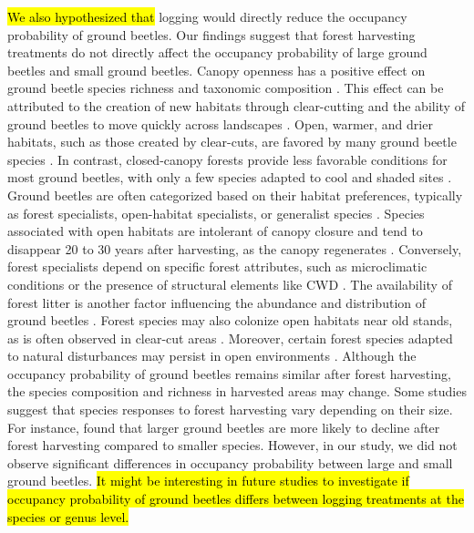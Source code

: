 \hl{We also hypothesized that} logging would directly reduce the occupancy probability of ground beetles. 
Our findings suggest that forest harvesting treatments do not directly affect the occupancy probability of large ground beetles and small ground beetles. 
Canopy openness has a positive effect on ground beetle species richness and taxonomic composition \citep{Halme1993Carabidbeetles,Heliola2001Distributioncarabid,Koivula2002Alternativeharvesting}. 
This effect can be attributed to the creation of new habitats through clear-cutting and the ability of ground beetles to move quickly across landscapes \citep{Niemela2007effectsforestry}. 
Open, warmer, and drier habitats, such as those created by clear-cuts, are favored by many ground beetle species \citep{Niemela2007effectsforestry}. 
In contrast, closed-canopy forests provide less favorable conditions for most ground beetles, with only a few species adapted to cool and shaded sites \citep{Niemela1993Effectsclearcut,koivulaBorealCarabidbeetleColeoptera2002a}. 
Ground beetles are often categorized based on their habitat preferences, typically as forest specialists, open-habitat specialists, or generalist species \citep{Niemela2007effectsforestry}. 
Species associated with open habitats are intolerant of canopy closure and tend to disappear 20 to 30 years after harvesting, as the canopy regenerates \citep{Niemela1996importancesmallscale,Koivula2002Alternativeharvesting}. 
Conversely, forest specialists depend on specific forest attributes, such as microclimatic conditions or the presence of structural elements like CWD \citep{Niemela1996importancesmallscale,Heliola2001Distributioncarabid,Koivula2002Alternativeharvesting,Work2004Standcomposition}. 
The availability of forest litter is another factor influencing the abundance and distribution of ground beetles \citep{koivula.LeafLitterSmallscale1999,Heliola2001Distributioncarabid,Magura2005ImpactsLeaflitter}. 
Forest species may also colonize open habitats near old stands, as is often observed in clear-cut areas \citep{Spence1996Northernforestry,Koivula2002Alternativeharvesting}. 
Moreover, certain forest species adapted to natural disturbances may persist in open environments \citep{Niemela2007effectsforestry}. 
Although the occupancy probability of ground beetles remains similar after forest harvesting, the species composition and richness in harvested areas may change. 
Some studies suggest that species responses to forest harvesting vary depending on their size. 
For instance, \cite{Nolte2019Habitatspecialization} found that larger ground beetles are more likely to decline after forest harvesting compared to smaller species. 
However, in our study, we did not observe significant differences in occupancy probability between large and small ground beetles. 
\hl{It might be interesting in future studies to investigate if occupancy probability of ground beetles differs between logging treatments at the species or genus level.}

